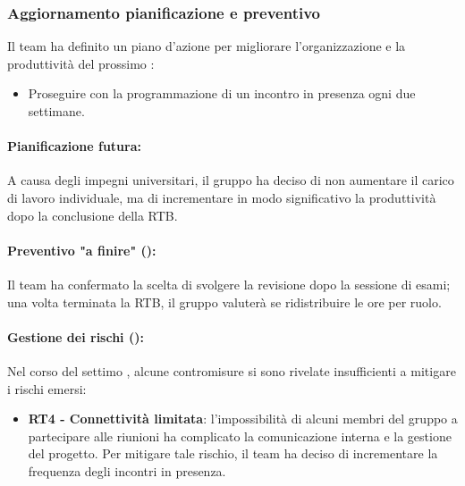 \subsubsection{Aggiornamento pianificazione e preventivo}
\par Il team ha definito un piano d'azione per migliorare l'organizzazione e la produttività del prossimo :
\begin{itemize}
  \item Proseguire con la programmazione di un incontro in presenza ogni due settimane.
\end{itemize}

\paragraph*{Pianificazione futura:}
\par A causa degli impegni universitari, il gruppo ha deciso di non aumentare il carico di lavoro individuale, ma di incrementare in modo significativo la produttività dopo la conclusione della RTB.

\paragraph*{Preventivo "a finire" ():}
\par Il team ha confermato la scelta di svolgere la revisione  dopo la sessione di esami; una volta terminata la RTB, il gruppo valuterà se ridistribuire le ore per ruolo.

\paragraph*{Gestione dei rischi ():}
\par Nel corso del settimo , alcune contromisure si sono rivelate insufficienti a mitigare i rischi emersi:
\begin{itemize}
  \item \textbf{RT4 - Connettività limitata}: l'impossibilità di alcuni membri del gruppo a partecipare alle riunioni ha complicato la comunicazione interna e la gestione del progetto. Per mitigare tale rischio, il team ha deciso di incrementare la frequenza degli incontri in presenza.
\end{itemize}

